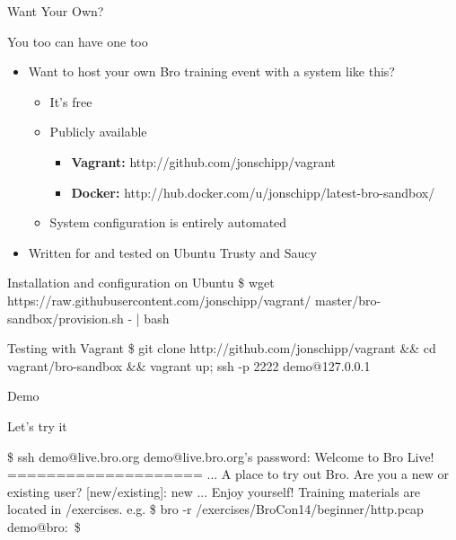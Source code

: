 \documentclass[xcolor=svgnames,handout]{beamer}
\begin{document}
\begin{frame}{Want Your Own?}
  \begin{block}{You too can have one too}
    \begin{itemize}
      \item Want to host your own Bro training event with a system like this?
    	\begin{itemize}
		\item It's free
		\item Publicly available
		\begin{itemize}
			\item \textbf{Vagrant:} http://github.com/jonschipp/vagrant
			\item \textbf{Docker:} http://hub.docker.com/u/jonschipp/latest-bro-sandbox/
		\end{itemize}
		\item System configuration is entirely automated
	\end{itemize}
	\item Written for and tested on Ubuntu Trusty and Saucy
    \end{itemize}
  \end{block}
  \begin{exampleblock}{Installation and configuration on Ubuntu}
	\alert{\$ wget https://raw.githubusercontent.com/jonschipp/vagrant/
	master/bro-sandbox/provision.sh - | bash}
  \end{exampleblock}
  \begin{exampleblock}{Testing with Vagrant}
	\alert{\$ git clone http://github.com/jonschipp/vagrant \&\& cd vagrant/bro-sandbox \&\& vagrant up; ssh -p 2222 demo@127.0.0.1}
  \end{exampleblock}
\end{frame}

\begin{frame}{Demo}
  \begin{exampleblock}{Let's try it}
\begin{semiverbatim}
\$ ssh demo@live.bro.org \newline
demo@live.bro.org's password:  \newline
Welcome to Bro Live! \newline
==================== \newline
... 		     \newline
A place to try out Bro. \newline
Are you a new or existing user? [new/existing]: new \newline
... \newline
Enjoy yourself! \newline
Training materials are located in /exercises. \newline
e.g. \$ bro -r /exercises/BroCon14/beginner/http.pcap \newline
demo@bro:~\$
\end{semiverbatim}
  \end{exampleblock}
\end{frame}
\end{document}
